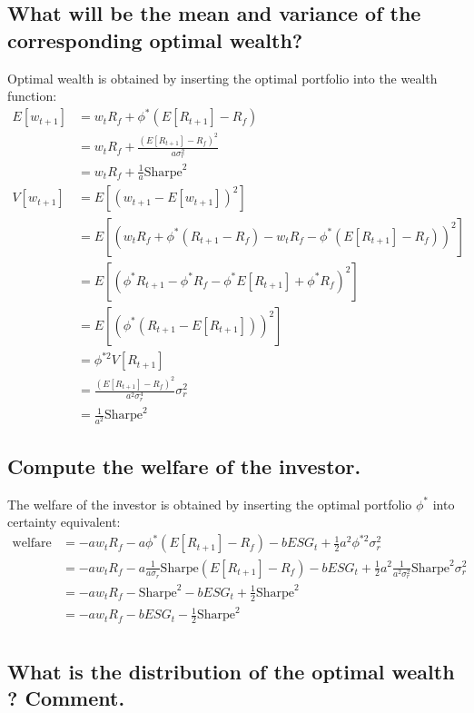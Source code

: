 \documentclass[]{article}
\begin{document}
\subsection{What will be the mean and variance of the corresponding optimal wealth?}
Optimal wealth is obtained by inserting the optimal portfolio into the wealth function:
\begin{align*}
	E[w_{t+1}] &= w_t R_f + \phi^* (E[R_{t+1}]-R_f)\\
	&= w_t R_f + \frac{(E[R_{t+1}] - R_f)^2}{a \sigma_r^2}\\
	&= w_t R_f + \frac{1}{a}\text{Sharpe}^2\\
	V[w_{t+1}] &= E[(w_{t+1} - E[w_{t+1}])^2]\\
	&= E[(w_t R_f + \phi^* (R_{t+1}-R_f) - w_t R_f - \phi^* (E[R_{t+1}]-R_f))^2]\\
	&= E[(\phi^* R_{t+1} - \phi^* R_f - \phi^* E[R_{t+1}] + \phi^* R_f)^2]\\
	&= E[(\phi^*(R_{t+1} - E[R_{t+1}]))^2]\\
	&= \phi^{*2} V[R_{t+1}]\\
	&= \frac{(E[R_{t+1}] - R_f)^2}{a^2 \sigma_r^4} \sigma_r^2\\
	&= \frac{1}{a^2}\text{Sharpe}^2
\end{align*}

\subsection{Compute the welfare of the investor.}
The welfare of the investor is obtained by inserting the optimal portfolio $\phi^*$ into certainty equivalent: 
\begin{align*}
	\text{welfare} &= -aw_t R_f -a \phi^* (E[R_{t+1}] - R_f) - bESG_t + \frac{1}{2}a^2 \phi^{*2} \sigma_r^2\\
	&= -aw_t R_f -a \frac{1}{a \sigma_r}\text{Sharpe} (E[R_{t+1}] - R_f) - bESG_t + \frac{1}{2}a^2 \frac{1}{a^2 \sigma_r^2}\text{Sharpe}^2 \sigma_r^2\\
	&= -aw_t R_f -\text{Sharpe}^2 - bESG_t + \frac{1}{2}\text{Sharpe}^2\\
	&= -aw_t R_f - bESG_t - \frac{1}{2}\text{Sharpe}^2\\
\end{align*}

\subsection{What is the distribution of the optimal wealth ? Comment.}
\end{document}
